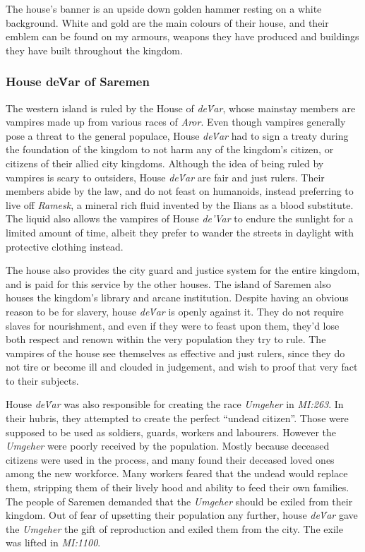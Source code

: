 The house's banner is an upside down golden hammer resting on a white
background. White and gold are the main colours of their house, and their
emblem can be found on my armours, weapons they have produced and buildings
they have built throughout the kingdom.

\subsubsection{House de\'Var of Saremen}
\label{sec:House deVar}

The western island is ruled by the House of \emph{de\'Var}, whose mainstay
members are vampires made up from various races of \emph{Aror}. Even though
vampires generally pose a threat to the general populace, House \emph{de\'Var}
had to sign a treaty during the foundation of the kingdom to not harm any of
the kingdom's citizen, or citizens of their allied city kingdoms. Although
the idea of being ruled by vampires is scary to outsiders, House \emph{de\'Var}
are fair and just rulers. Their members abide by the law, and do not feast on
humanoids, instead preferring to live off \emph{Ramesk}, a mineral rich fluid
invented by the Ilians as a blood substitute. The liquid also allows the
vampires of House \emph{de'Var} to endure the sunlight for a limited amount of
time, albeit they prefer to wander the streets in daylight with protective
clothing instead.

The house also provides the city guard and justice system for the entire
kingdom, and is paid for this service by the other houses. The island of
Saremen also houses the kingdom's library and arcane institution. Despite
having an obvious reason to be for slavery, house \emph{de\'Var} is openly
against it. They do not require slaves for nourishment, and even if they were
to feast upon them, they'd lose both respect and renown within the very
population they try to rule. The vampires of the house see themselves as
effective and just rulers, since they do not tire or become ill and clouded in
judgement, and wish to proof that very fact to their subjects.

House \emph{de\'Var} was also responsible for creating the race \emph{Umgeher}
in \emph{MI:263}. In their hubris, they attempted to create the perfect
``undead citizen''. Those were supposed to be used as soldiers, guards,
workers and labourers. However the \emph{Umgeher} were poorly received by the
population. Mostly because deceased citizens were used in the process, and
many found their deceased loved ones among the new workforce. Many workers
feared that the undead would replace them, stripping them of their lively hood
and ability to feed their own families. The people of Saremen demanded that
the \emph{Umgeher} should be exiled from their kingdom. Out of fear of
upsetting their population any further, house \emph{de\'Var} gave the
\emph{Umgeher} the gift of reproduction and exiled them from the city. The
exile was lifted in \emph{MI:1100}.

